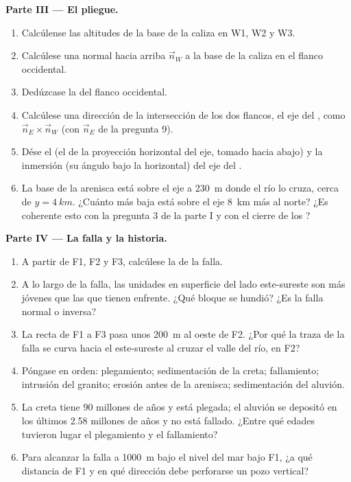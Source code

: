 \begin{problem}
\medskip
\noindent\textbf{Parte III --- El pliegue.}
\begin{enumerate}[resume]
  \item Calcúlense las altitudes de la base de la caliza en W1, W2 y W3.
  \item Calcúlese una normal hacia arriba $\vec n_W$ a la base de la caliza en el flanco occidental.
  \item Dedúzcase la  del flanco occidental.
  \item Calcúlese una dirección de la intersección de los dos flancos, el eje del , como
        $\vec n_E \times \vec n_W$ (con $\vec n_E$ de la pregunta 9).
  \item Dése el  (el  de la proyección horizontal del eje, tomado hacia abajo) y la
        inmersión (su ángulo bajo la horizontal) del eje del .
  \item La base de la arenisca está sobre el eje a \qty{230}{m} donde el río lo cruza, cerca de
        $y = \qty{4}{km}$. ¿Cuánto más baja está sobre el eje \qty{8}{km} más al norte? ¿Es coherente
        esto con la pregunta 3 de la parte I y con el cierre de los ?
\end{enumerate}

\medskip
\noindent\textbf{Parte IV --- La falla y la historia.}
\begin{enumerate}[resume]
  \item A partir de F1, F2 y F3, calcúlese la  de la falla.
  \item A lo largo de la falla, las unidades en superficie del lado este-sureste son más jóvenes que
        las que tienen enfrente. ¿Qué bloque se hundió? ¿Es la falla normal o inversa?
  \item La recta de F1 a F3 pasa unos \qty{200}{m} al oeste de F2. ¿Por qué la traza de la falla se
        curva hacia el este-sureste al cruzar el valle del río, en F2?
  \item Póngase en orden: plegamiento; sedimentación de la creta; fallamiento; intrusión del granito;
        erosión antes de la arenisca; sedimentación del aluvión.
  \item La creta tiene 90 millones de años y está plegada; el aluvión se depositó en los últimos
        2.58 millones de años y no está fallado. ¿Entre qué edades tuvieron lugar el plegamiento y el
        fallamiento?
  \item Para alcanzar la falla a \qty{1000}{m} bajo el nivel del mar bajo F1, ¿a qué distancia de F1 y
        en qué dirección debe perforarse un pozo vertical?
\end{enumerate}
\end{problem}
